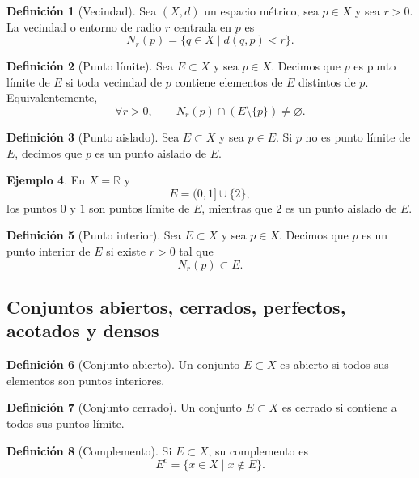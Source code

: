 \documentclass[12pt]{article}
\theoremstyle{definition}
\newtheorem{definition}{Definición}[section]
\newtheorem{example}[definition]{Ejemplo}
\theoremstyle{plain}
\theoremstyle{remark}
\begin{document}
\begin{definition}[Vecindad]
Sea $(X,d)$ un espacio métrico, sea $p\in X$ y sea $r>0$.
La vecindad o entorno de radio $r$ centrada en $p$ es
\[
N_r(p)=\{q\in X\mid d(q,p)<r\}.
\]
\end{definition}

\begin{definition}[Punto límite]
Sea $E\subset X$ y sea $p\in X$.
Decimos que $p$ es punto límite de $E$ si toda vecindad de $p$ contiene elementos de $E$ distintos de $p$.
Equivalentemente,
\[
\forall r>0,\qquad N_r(p)\cap(E\setminus\{p\})\neq\varnothing.
\]
\end{definition}

\begin{definition}[Punto aislado]
Sea $E\subset X$ y sea $p\in E$.
Si $p$ no es punto límite de $E$, decimos que $p$ es un punto aislado de $E$.
\end{definition}

\begin{example}
En $X=\mathbb R$ y
\[
E=(0,1]\cup\{2\},
\]
los puntos $0$ y $1$ son puntos límite de $E$, mientras que $2$ es un punto aislado de $E$.
\end{example}

\begin{definition}[Punto interior]
Sea $E\subset X$ y sea $p\in X$.
Decimos que $p$ es un punto interior de $E$ si existe $r>0$ tal que
\[
N_r(p)\subset E.
\]
\end{definition}

\subsection*{Conjuntos abiertos, cerrados, perfectos, acotados y densos}

\begin{definition}[Conjunto abierto]
Un conjunto $E\subset X$ es abierto si todos sus elementos son puntos interiores.
\end{definition}

\begin{definition}[Conjunto cerrado]
Un conjunto $E\subset X$ es cerrado si contiene a todos sus puntos límite.
\end{definition}

\begin{definition}[Complemento]
Si $E\subset X$, su complemento es
\[
E^c=\{x\in X\mid x\notin E\}.
\]
\end{definition}
\end{document}
